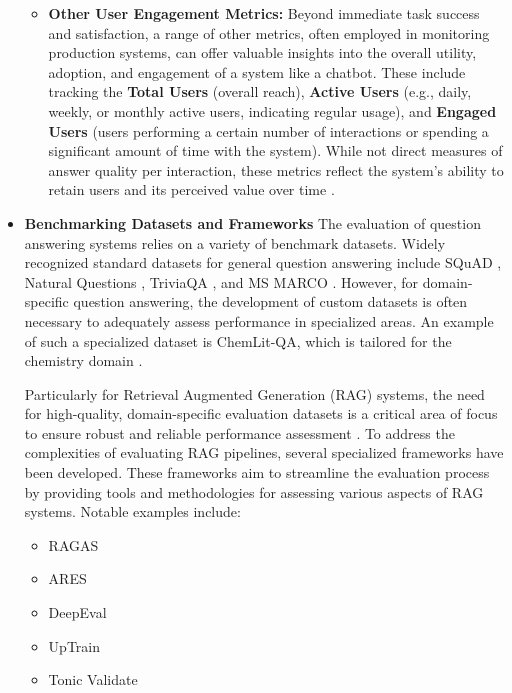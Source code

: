 \documentclass[12pt]{report}
\begin{document}
\begin{itemize}
\begin{itemize}
      \item \textbf{Other User Engagement Metrics:} Beyond immediate task success and satisfaction, a range of other metrics, often employed in monitoring production systems, can offer valuable insights into the overall utility, adoption, and engagement of a system like a chatbot. These include tracking the \textbf{Total Users} (overall reach), \textbf{Active Users} (e.g., daily, weekly, or monthly active users, indicating regular usage), and \textbf{Engaged Users} (users performing a certain number of interactions or spending a significant amount of time with the system). While not direct measures of answer quality per interaction, these metrics reflect the system's ability to retain users and its perceived value over time \cite{Williams2020, Zamora2021}.
  \end{itemize}

  \item \textbf{Benchmarking Datasets and Frameworks}
  The evaluation of question answering systems relies on a variety of benchmark datasets. Widely recognized standard datasets for general question answering include SQuAD \cite{Rajpurkar2016SQuAD}, Natural Questions \cite{Kwiatkowski2019NaturalQuestions}, TriviaQA \cite{Joshi2017TriviaQA}, and MS MARCO \cite{Campos2016MSMARCO}. However, for domain-specific question answering, the development of custom datasets is often necessary to adequately assess performance in specialized areas. An example of such a specialized dataset is ChemLit-QA, which is tailored for the chemistry domain \cite{Corrales2024ChemLitQA}.

  Particularly for Retrieval Augmented Generation (RAG) systems, the need for high-quality, domain-specific evaluation datasets is a critical area of focus to ensure robust and reliable performance assessment \cite{Es2023RAGAS, SaadFalcon2023ARES}. To address the complexities of evaluating RAG pipelines, several specialized frameworks have been developed. These frameworks aim to streamline the evaluation process by providing tools and methodologies for assessing various aspects of RAG systems. Notable examples include:
  \begin{itemize}
      \item RAGAS \cite{Es2023RAGAS}
      \item ARES \cite{SaadFalcon2023ARES}
      \item DeepEval \cite{Li2024DeepEval}
      \item UpTrain \cite{UpTrainAI}
      \item Tonic Validate \cite{TonicValidate}
  \end{itemize}


\end{itemize}
\end{document}
